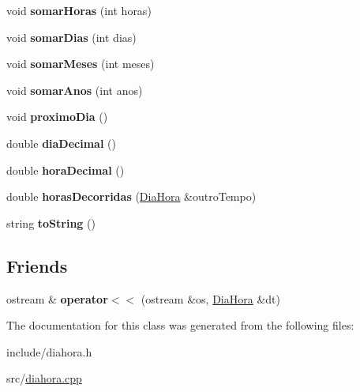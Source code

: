 \begin{DoxyCompactItemize}
\item 
\mbox{\label{classDiaHora_a970c76f04a04927cae98b35c71e95d4d}} 
void {\bfseries somar\+Horas} (int horas)
\item 
\mbox{\label{classDiaHora_a163dfe90f0c908040ff80cf7ecbda3bb}} 
void {\bfseries somar\+Dias} (int dias)
\item 
\mbox{\label{classDiaHora_aa7dfe2a60c6ed68be03acc8ed94d4abd}} 
void {\bfseries somar\+Meses} (int meses)
\item 
\mbox{\label{classDiaHora_ac97ab2f26ea6998cf7189bf030dde333}} 
void {\bfseries somar\+Anos} (int anos)
\item 
\mbox{\label{classDiaHora_ac1299ac04b8ff6e528999c57e1e612bc}} 
void {\bfseries proximo\+Dia} ()
\item 
\mbox{\label{classDiaHora_a308ef7685e4ba7865aeec6776f15875a}} 
double {\bfseries dia\+Decimal} ()
\item 
\mbox{\label{classDiaHora_a2da6b5cc489d269f03540ca4f7b08672}} 
double {\bfseries hora\+Decimal} ()
\item 
\mbox{\label{classDiaHora_ad1f9b566b0a63e9c84feb2c5893e953b}} 
double {\bfseries horas\+Decorridas} (\hyperlink{classDiaHora}{Dia\+Hora} \&outro\+Tempo)
\item 
\mbox{\label{classDiaHora_a3371158e2dffb4b42e90ef62b2567293}} 
string {\bfseries to\+String} ()
\end{DoxyCompactItemize}
\subsection*{Friends}
\begin{DoxyCompactItemize}
\item 
\mbox{\label{classDiaHora_af175ad9b86d1309ea389548d80c9782a}} 
ostream \& {\bfseries operator$<$$<$} (ostream \&os, \hyperlink{classDiaHora}{Dia\+Hora} \&dt)
\end{DoxyCompactItemize}


The documentation for this class was generated from the following files\+:\begin{DoxyCompactItemize}
\item 
include/diahora.\+h\item 
src/\hyperlink{diahora_8cpp}{diahora.\+cpp}\end{DoxyCompactItemize}

